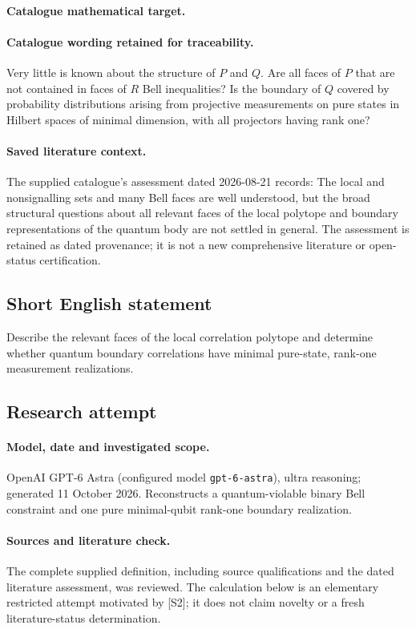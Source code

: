 \documentclass[11pt]{article}
\begin{document}
\paragraph{Catalogue mathematical target.}
\paragraph{Catalogue wording retained for traceability.}
Very little is known about the structure of $P$ and $Q$. Are all faces of $P$ that are not contained in faces of $R$ Bell inequalities? Is the boundary of $Q$ covered by probability distributions arising from projective measurements on pure states in Hilbert spaces of minimal dimension, with all projectors having rank one?

\paragraph{Saved literature context.} The supplied catalogue's assessment dated 2026-08-21 records: The local and nonsignalling sets and many Bell faces are well understood, but the broad structural questions about all relevant faces of the local polytope and boundary representations of the quantum body are not settled in general. The assessment is retained as dated provenance; it is not a new comprehensive literature or open-status certification.
\subsection{Short English statement}
Describe the relevant faces of the local correlation polytope and determine whether quantum boundary correlations have minimal pure-state, rank-one measurement realizations.
\subsection{Research attempt}
\paragraph{Model, date and investigated scope.}
OpenAI GPT-6 Astra (configured model \texttt{gpt-6-astra}), ultra reasoning; generated 11 October 2026. Reconstructs a quantum-violable binary Bell constraint and one pure minimal-qubit rank-one boundary realization.

\paragraph{Sources and literature check.}
The complete supplied definition, including source qualifications and the dated literature assessment, was reviewed. The calculation below is an elementary restricted attempt motivated by [S2]; it does not claim novelty or a fresh literature-status determination.
\end{document}
